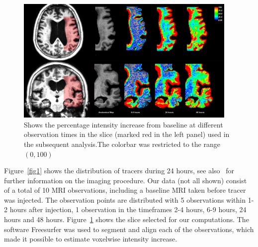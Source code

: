 \documentclass[11pt,a4paper]{article}
\begin{document}
\begin{figure}
\includegraphics[width=0.95\textwidth]{Zoom-PatID-68.png} 
\caption{Shows the percentage intensity increase from baseline at different observation times in the slice (marked red in the left panel) used in the subsequent analysis.The colorbar was restricted to the range $(0,100)$}
\label{fig2} 
\end{figure}
Figure~\ref{fig1} shows the distribution of tracers during 24 hours, see also~\cite{ringstad2018brain} for further information on the imaging procedure.   
Our data (not all shown) consist of a total of 10 MRI observations, including a baseline MRI taken before tracer was injected. The observation points are distributed with 5 observations within 1-2 hours after injection, 1 observation in the timeframes 2-4 hours, 6-9 hours, 24 hours and 48 hours. 
Figure~\ref{fig2} shows the slice selected for our computations. 
The software Freesurfer was used to segment and align each of the observations, which made it possible to estimate voxelwise intensity increase. 
\end{document}
